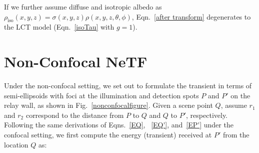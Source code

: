 \documentclass[10pt,journal,compsoc]{IEEEtran}
\DeclareMathOperator{\di}{d\!}
\begin{document}
\begin{appendices}
If we further assume diffuse and isotropic albedo as $\rho_{\text{iso}}(x,y,z) = \sigma(x,y,z) \rho(x,y,z,\theta,\phi)$, Eqn.~\ref{after transform} degenerates to the LCT model (Eqn.~\ref{isoTau} with $g = 1$).



\section{Non-Confocal NeTF}

Under the non-confocal setting, we set out to formulate the transient in terms of semi-ellipsoids with foci at the illumination and detection spots $P$ and $P'$ on the relay wall, as shown in Fig.~\ref{nonconfocalfigure}. Given a scene point $Q$, assume $r_1$ and $r_2$ correspond to the distance from $P$ to $Q$ and $Q$ to $P'$, respectively. Following the same derivations of Eqns.~\ref{EQ}, ~\ref{EQ'}, and~\ref{EP'} under the confocal setting, we first compute the energy (transient) received at $P'$ from the location $Q$ as:






\end{appendices}
\end{document}
